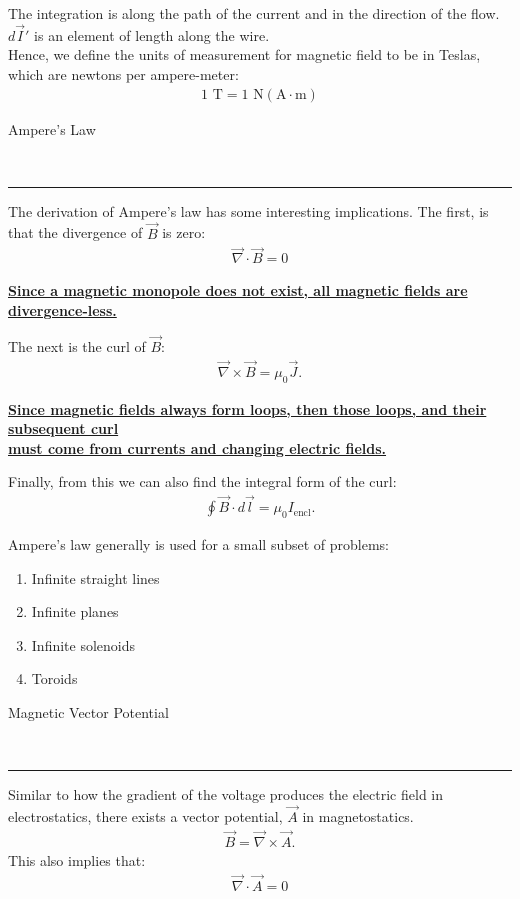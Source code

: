 \documentclass{article}
\newcommand{\header}[1]{\begin{large}\noindent #1\end{large}\\\rule{\textwidth}{0.5pt}}
\newcommand{\gap}{\medskip\\}
\begin{document}
The integration is along the path of the current and in the direction of the flow.
$d\vec{I}'$ is an element of length along the wire. 
\gap
Hence, we define the units of measurement for magnetic field to be in Teslas,
which are newtons per ampere-meter:
\begin{align*}
    1 \,\,\textrm{T} = 1 \, \,\textrm{N}(\textrm{A} \cdot \textrm{m})
\end{align*} 
\header{Ampere's Law}
The derivation of Ampere's law has some interesting implications. The first,
is that the divergence of $\vec{B}$ is zero:
\begin{align*}
    \vec{\nabla} \cdot \vec{B} = 0
\end{align*}
\begin{center}
    \underline{\textbf{Since a magnetic monopole does not exist, all magnetic fields are divergence-less.}}
\end{center}
The next is the curl of $\vec{B}$:
\begin{align*}
    \vec{\nabla} \times \vec{B} = \mu_0\vec{J}.
\end{align*}
\begin{center}
    \underline{\textbf{Since magnetic fields always form loops, then those loops, and their subsequent curl}}\\
    \underline{\textbf{ must come from currents and changing electric fields.}}
\end{center}
Finally, from this we can also find the integral form of the curl:
\begin{align*}
    \oint \vec{B} \cdot d\vec{l} = \mu_0 I_\textrm{encl}.
\end{align*}

Ampere's law generally is used for a small subset of problems:
\begin{enumerate}
    \item Infinite straight lines
    \item Infinite planes
    \item Infinite solenoids
    \item Toroids
\end{enumerate}

\header{Magnetic Vector Potential}

Similar to how the gradient of the voltage produces the electric field in 
electrostatics, there exists a vector potential, $\vec{A}$ in magnetostatics.
\begin{align*}
    \vec{B} = \vec{\nabla} \times \vec{A}.
\end{align*}
This also implies that:
\begin{align*}
    \vec{\nabla} \cdot \vec{A} = 0
\end{align*}
\end{document}

